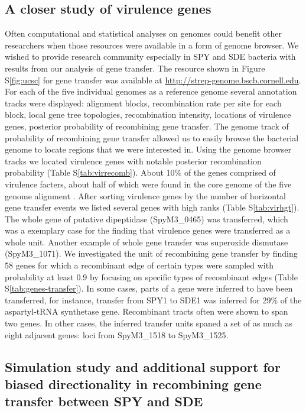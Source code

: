 \documentclass[10pt]{article}
\let\citep\cite
\begin{document}
\subsection*{A closer study of virulence genes}

Often computational and statistical analyses on genomes could benefit other
researchers when those resources were available in a form of genome browser.  We wished to
provide research community especially in SPY and SDE bacteria with results from
our analysis of gene transfer.  The resource shown in Figure S\ref{fig:ucsc} for
gene transfer was available at \url{http://strep-genome.bscb.cornell.edu}.  For
each of the five individual genomes as a reference genome several annotation
tracks were displayed: alignment blocks, recombination rate per site for each
block, local gene tree topologies, recombination intensity, locations of
virulence genes, posterior probability of recombining gene transfer. The genome
track of probability of recombining gene transfer allowed us to easily browse
the bacterial genome to locate regions that we were interested in.  Using
the genome browser tracks we located virulence genes with notable posterior
recombination probability (Table S\ref{tab:virrecomb}).  About 10\% of the genes
comprised of virulence facters, about half of which were found in the core
genome of the five genome alignment \citep{Suzuki2011}.  After sorting virulence
genes by the number of horizontal gene transfer events we listed several genes
with high ranks (Table S\ref{tab:virhgt}).
The whole gene of  putative dipeptidase (SpyM3\_0465) was transferred, which was
a exemplary case for the finding \citep{Chan2009} that virulence genes were transferred as a whole
unit.  Another example of whole gene transfer was superoxide
dismutase (SpyM3\_1071).  We investigated the unit of recombining gene transfer
by finding 58 genes for which a recombinant edge of certain types were sampled
with probability at least 0.9 by focusing on specific types of recombinant edges
(Table S\ref{tab:genes-transfer}).  In some cases, parts of a gene were inferred
to have been transferred, for instance, transfer from SPY1 to SDE1 was inferred
for 29\% of the aspartyl-tRNA synthetase gene. Recombinant tracts often were
shown to span two genes.  In other cases, the inferred transfer units spaned a
set of as much as eight adjacent genes: loci from SpyM3\_1518 to SpyM3\_1525.

\subsection*{Simulation study and additional support for biased directionality
in recombining gene transfer between SPY and SDE}
\end{document}
